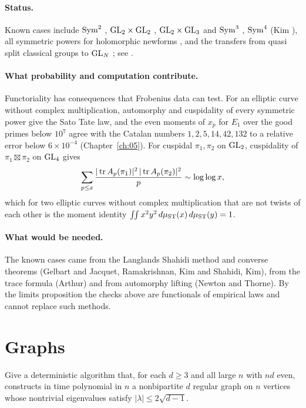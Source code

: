 \paragraph{Status.} Known cases include $\operatorname{Sym}^2$ \cite{gelbartjacquet1978}, $\mathrm{GL}_2\times\mathrm{GL}_2$ \cite{ramakrishnan2000}, $\mathrm{GL}_2\times\mathrm{GL}_3$ and $\operatorname{Sym}^3$ \cite{kimshahidi2002}, $\operatorname{Sym}^4$ (Kim \cite{kimsarnak2003}), all symmetric powers for holomorphic newforms \cite{newtonthorne2021,newtonthorne2021b}, and the transfers from quasi split classical groups to $\mathrm{GL}_N$ \cite{arthur2013}; see \cite{arthur2003,gelbart1984}.

\paragraph{What probability and computation contribute.} Functoriality has consequences that Frobenius data can test. For an elliptic curve without complex multiplication, automorphy and cuspidality of every symmetric power give the Sato Tate law, and the even moments of $x_p$ for $E_1$ over the good primes below $10^7$ agree with the Catalan numbers $1,2,5,14,42,132$ to a relative error below $6\times10^{-4}$ (Chapter~\ref{ch:05}). For cuspidal $\pi_1,\pi_2$ on $\mathrm{GL}_2$, cuspidality of $\pi_1\boxtimes\pi_2$ on $\mathrm{GL}_4$ gives
\[
\sum_{p\le x}\frac{|\operatorname{tr} A_p(\pi_1)|^2\,|\operatorname{tr} A_p(\pi_2)|^2}{p}\sim\log\log x,
\]
which for two elliptic curves without complex multiplication that are not twists of each other is the moment identity $\int\!\!\int x^2y^2\,d\mu_{\mathrm{ST}}(x)\,d\mu_{\mathrm{ST}}(y)=1$.

\paragraph{What would be needed.} The known cases came from the Langlands Shahidi method and converse theorems (Gelbart and Jacquet, Ramakrishnan, Kim and Shahidi, Kim), from the trace formula (Arthur) and from automorphy lifting (Newton and Thorne). By the limits proposition the checks above are functionals of empirical laws and cannot replace such methods.

\section{Graphs}

\begin{problem}\label{op:graphs}
Give a deterministic algorithm that, for each $d\ge 3$ and all large $n$ with $nd$ even, constructs in time polynomial in $n$ a nonbipartite $d$ regular graph on $n$ vertices whose nontrivial eigenvalues satisfy $|\lambda|\le 2\sqrt{d-1}$.
\end{problem}


